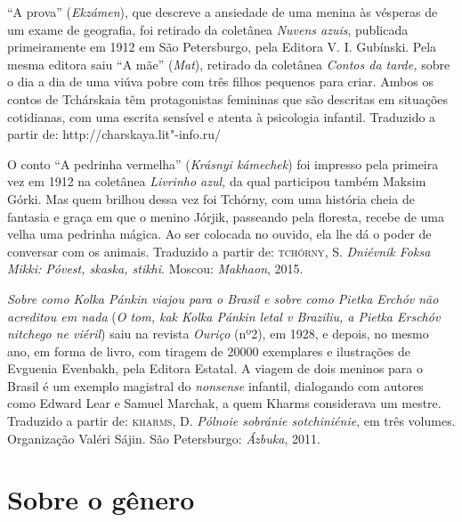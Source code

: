 {\medskip

``A prova'' (\emph{Ekzámen}), que descreve a ansiedade de uma
menina às vésperas de um exame de geografia, foi retirado da coletânea
\emph{Nuvens azuis}, publicada primeiramente em 1912 em São Petersburgo,
pela Editora V. I. Gubínski. Pela mesma editora saiu ``A mãe''
(\emph{Mat}), retirado da coletânea \emph{Contos da tarde,} sobre o dia
a dia de uma viúva pobre com três filhos pequenos para criar. Ambos os
contos de Tchárskaia têm protagonistas femininas que são descritas em situações
cotidianas, com uma escrita sensível e atenta à psicologia infantil.
Traduzido a partir de: http://charskaya.lit"-info.ru/

\medskip

O conto ``A pedrinha vermelha'' (\emph{Krásnyi kámechek}) foi impresso
pela primeira vez em 1912 na coletânea \emph{Livrinho azul,} da qual
participou também Maksim Górki. Mas quem brilhou dessa vez foi Tchórny,
com uma história cheia de fantasia e graça em que o menino Jórjik,
passeando pela floresta, recebe de uma velha uma pedrinha mágica. Ao
ser colocada no ouvido, ela lhe dá o poder de conversar com os animais.
Traduzido a partir de:
\textsc{tchórny}, S. \emph{Dniévnik Foksa Mikki: Póvest, skaska, stikhi}. Moscou:
\emph{Makhaon}, 2015.

\medskip

\emph{Sobre como Kolka Pánkin viajou para o Brasil e sobre como Pietka
Erchóv não acreditou em nada} (\emph{O tom, kak Kolka Pánkin letal v
Braziliu, a Pietka Erschóv nitchego ne viéril}) saiu na revista
\emph{Ouriço} (nº2), em 1928, e depois, no mesmo ano, em forma de livro,
com tiragem de 20000 exemplares e ilustrações de Evguenia Evenbakh, pela
Editora Estatal. A viagem de dois meninos para o Brasil é um exemplo
magistral do \emph{nonsense} infantil, dialogando com autores como
Edward Lear e Samuel Marchak, a quem Kharms considerava um mestre.
Traduzido a partir de:
\textsc{kharms}, D. \emph{Pólnoie sobránie sotchiniénie}, em três volumes.
Organização Valéri Sájin. São Petersburgo: \emph{Ázbuka}, 2011.

\section{Sobre o gênero}

}
